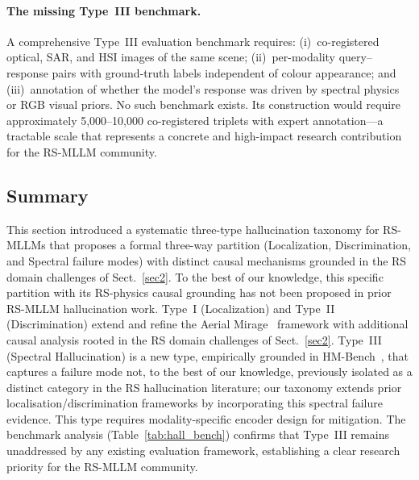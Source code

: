 \paragraph{The missing Type~III benchmark.}
A comprehensive Type~III evaluation benchmark requires: (i)~co-registered
optical, SAR, and HSI images of the same scene; (ii)~per-modality
query--response pairs with ground-truth labels independent of colour
appearance; and (iii)~annotation of whether the model's response was
driven by spectral physics or RGB visual priors. No such benchmark
exists. Its construction would require approximately 5,000--10,000
co-registered triplets with expert annotation---a tractable scale that
represents a concrete and high-impact research contribution for the
RS-MLLM community.

\subsection*{Summary}

This section introduced a systematic three-type hallucination
taxonomy for RS-MLLMs that proposes a formal three-way partition
(Localization, Discrimination, and Spectral failure modes) with distinct
causal mechanisms grounded in the RS domain challenges of Sect.~\ref{sec2}.
To the best of our knowledge, this specific partition with its RS-physics
causal grounding has not been proposed in prior RS-MLLM hallucination work.
Type~I (Localization) and Type~II (Discrimination)
extend and refine the Aerial Mirage~\cite{aerialmirage2026} framework with
additional causal analysis rooted in the RS domain challenges of
Sect.~\ref{sec2}. Type~III (Spectral Hallucination) is a new type,
empirically grounded in HM-Bench~\cite{hmbench2026}, that captures a
failure mode not, to the best of our knowledge, previously isolated as a
distinct category in the RS hallucination literature; our taxonomy extends
prior localisation/discrimination frameworks by incorporating this spectral
failure evidence. This type requires modality-specific encoder design for
mitigation. The benchmark analysis (Table~\ref{tab:hall_bench}) confirms that
Type~III remains unaddressed by any existing evaluation framework, establishing
a clear research priority for the RS-MLLM community.
